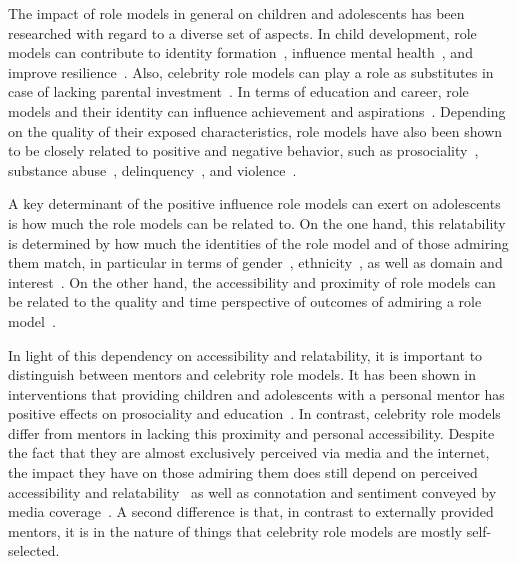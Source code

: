 The impact of role models in general on children and adolescents has been researched with regard to a diverse set of aspects. In child development, role models can contribute to identity formation~\autocite{vecci_behavioural_2019}, influence mental health~\autocite{bird_impact_2012}, and improve resilience~\autocite{werner_resilience_1995}. Also, celebrity role models can play a role as substitutes in case of lacking parental investment~\autocite{cheung_idol_2012}. In terms of education and career, role models and their identity can influence achievement and aspirations~\autocite{zirkel_is_2002, herrmann_effects_2016,christiansen_television_1979}. Depending on the quality of their exposed characteristics, role models have also been shown to be closely related to positive and negative behavior, such as prosociality~\autocite{kosse_formation_2020}, substance abuse~\autocite{yancey_role_2002, hurd_negative_2009}, delinquency~\autocite{walters_someone_2016}, and violence~\autocite{hurd_role_2011}.

A key determinant of the positive influence role models can exert on adolescents is how much the role models can be related to. On the one hand, this relatability is determined by how much the identities of the role model and of those admiring them match, in particular in terms of gender~\autocite{marx_female_2002, herrmann_effects_2016,lockwood_someone_2006}, ethnicity~\autocite{marx_obama_2009}, as well as domain and interest~\autocite{lockwood_superstars_1997}. On the other hand, the accessibility and proximity of role models can be related to the quality and time perspective of outcomes of admiring a role model~\autocite{strasser-burke_who_2020, bird_impact_2012}.

In light of this dependency on accessibility and relatability, it is important to distinguish between mentors and celebrity role models. It has been shown in interventions that providing children and adolescents with a personal mentor has positive effects on prosociality and education~\autocite{kosse_formation_2020, falk_mentoring_2020, dubois_natural_2005,rhodes_agents_2002,heckman_understanding_2013}. In contrast, celebrity role models differ from mentors in lacking this proximity and personal accessibility. Despite the fact that they are almost exclusively perceived via media and the internet, the impact they have on those admiring them does still depend on perceived accessibility and relatability~\autocite{strasser-burke_who_2020, lockwood_superstars_1997} as well as connotation and sentiment conveyed by media coverage~\autocite{lines_villains_2001, adamson_female_2019}. A second difference is that, in contrast to externally provided mentors, it is in the nature of things that celebrity role models are mostly self-selected.


